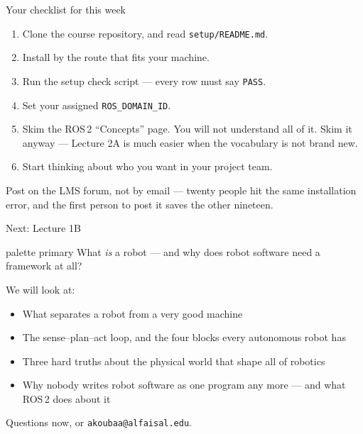 \documentclass[aspectratio=169]{beamer}
\begin{document}
\begin{frame}{Your checklist for this week}
  \begin{enumerate}
    \item Clone the course repository, and read \texttt{setup/README.md}.
    \item Install \rosver{} by the route that fits your machine.
    \item Run the setup check script --- every row must say \texttt{PASS}.
    \item Set your assigned \texttt{ROS\_DOMAIN\_ID}.
    \item Skim the ROS\,2 ``Concepts'' page. You will not understand all of it. Skim it anyway
          --- Lecture 2A is much easier when the vocabulary is not brand new.
    \item Start thinking about who you want in your project team.
  \end{enumerate}

  \vspace{0.8em}
  \begin{inthefield}
    \footnotesize
    Post on the LMS forum, not by email --- twenty people hit the same installation error, and
    the first person to post it saves the other nineteen.
  \end{inthefield}
\end{frame}

\begin{frame}{Next: Lecture 1B}
  \begin{beamercolorbox}[sep=8pt,center,rounded=true]{palette primary}
    \large What \emph{is} a robot --- and why does robot software need a framework at all?
  \end{beamercolorbox}

  \vspace{1.0em}
  We will look at:
  \begin{itemize}\small
    \item What separates a robot from a very good machine
    \item The sense--plan--act loop, and the four blocks every autonomous robot has
    \item Three hard truths about the physical world that shape all of robotics
    \item Why nobody writes robot software as one program any more --- and what ROS\,2 does
          about it
  \end{itemize}

  \vspace{1.0em}
  \centering \small Questions now, or \texttt{akoubaa@alfaisal.edu}.
\end{frame}
\end{document}
